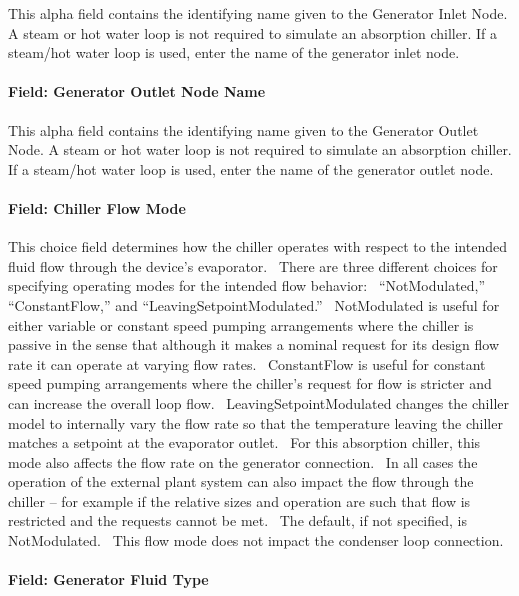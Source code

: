This alpha field contains the identifying name given to the Generator Inlet Node. A steam or hot water loop is not required to simulate an absorption chiller. If a steam/hot water loop is used, enter the name of the generator inlet node.

\paragraph{Field: Generator Outlet Node Name}\label{field-generator-outlet-node-name}

This alpha field contains the identifying name given to the Generator Outlet Node. A steam or hot water loop is not required to simulate an absorption chiller. If a steam/hot water loop is used, enter the name of the generator outlet node.

\paragraph{Field: Chiller Flow Mode}\label{field-chiller-flow-mode}

This choice field determines how the chiller operates with respect to the intended fluid flow through the device's evaporator. ~There are three different choices for specifying operating modes for the intended flow behavior:~ ``NotModulated,'' ``ConstantFlow,'' and ``LeavingSetpointModulated.''~ NotModulated is useful for either variable or constant speed pumping arrangements where the chiller is passive in the sense that although it makes a nominal request for its design flow rate it can operate at varying flow rates.~ ConstantFlow is useful for constant speed pumping arrangements where the chiller's request for flow is stricter and can increase the overall loop flow.~ LeavingSetpointModulated changes the chiller model to internally vary the flow rate so that the temperature leaving the chiller matches a setpoint at the evaporator outlet.~ For this absorption chiller, this mode also affects the flow rate on the generator connection.~ In all cases the operation of the external plant system can also impact the flow through the chiller -- for example if the relative sizes and operation are such that flow is restricted and the requests cannot be met.~ The default, if not specified, is NotModulated.~ This flow mode does not impact the condenser loop connection.

\paragraph{Field: Generator Fluid Type}\label{field-generator-fluid-type}

